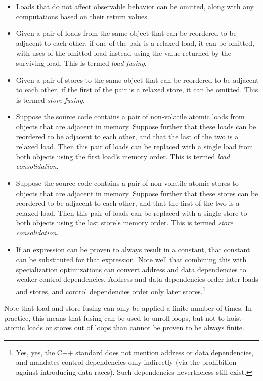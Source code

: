 \documentclass[10]{article}
\begin{document}
\begin{itemize}
\item	Loads that do not affect observable behavior can be omitted,
	along with any computations based on their return values.
\item	Given a pair of loads from the same object that can be
	reordered to be adjacent to each other, if one of the pair is a
	relaxed load, it can be omitted, with uses of the omitted load
	instead using the value returned by the surviving load.
	This is termed \emph{load fusing}.
\item	Given a pair of stores to the same object that can be reordered
	to be adjacent to each other, if the first of the pair is a
	relaxed store, it can be omitted.
	This is termed \emph{store fusing}.
\item	Suppose the source code contains a pair of non-volatile atomic
	loads from objects that are adjacent in memory.
	Suppose further that these loads can be reordered to be adjacent
	to each other, and that the last of the two is a relaxed load.
	Then this pair of loads can be replaced with a single load
	from both objects using the first load's memory order.
	This is termed \emph{load consolidation}.
\item	Suppose the source code contains a pair of non-volatile atomic
	stores to objects that are adjacent in memory.
	Suppose further that these stores can be reordered to be adjacent
	to each other, and that the first of the two is a relaxed load.
	Then this pair of loads can be replaced with a single store
	to both objects using the last store's memory order.
	This is termed \emph{store consolidation}.
\item	If an expression can be proven to always result in a constant,
	that constant can be substituted for that expression.
	Note well that combining this with specialization optimizations
	can convert address and data dependencies to weaker control
	dependencies.
	Address and data dependencies order later loads and stores,
	and control dependencies order only later stores.\footnote{
		Yes, yes, the C++ standard does not mention address or
		data dependencies, and mandates control dependencies
		only indirectly (via the prohibition against introducing
		data races).
		Such dependencies nevertheless still exist.}
\end{itemize}

Note that load and store fusing can only be applied a finite number of
times.
In practice, this means that fusing can be used to unroll loops, but
not to hoist atomic loads or stores out of loops than cannot be proven
to be always finite.
\end{document}
